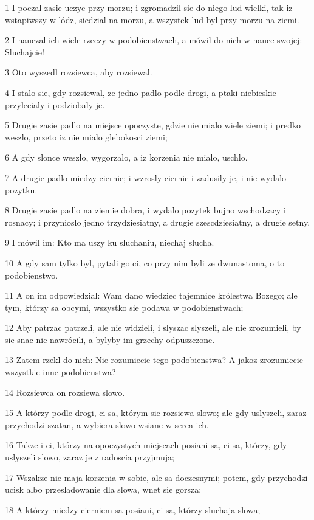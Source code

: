 \par 1 I poczal zasie uczyc przy morzu; i zgromadzil sie do niego lud wielki, tak iz wstapiwszy w lódz, siedzial na morzu, a wszystek lud byl przy morzu na ziemi.
\par 2 I nauczal ich wiele rzeczy w podobienstwach, a mówil do nich w nauce swojej: Sluchajcie!
\par 3 Oto wyszedl rozsiewca, aby rozsiewal.
\par 4 I stalo sie, gdy rozsiewal, ze jedno padlo podle drogi, a ptaki niebieskie przylecialy i podziobaly je.
\par 5 Drugie zasie padlo na miejsce opoczyste, gdzie nie mialo wiele ziemi; i predko weszlo, przeto iz nie mialo glebokosci ziemi;
\par 6 A gdy slonce weszlo, wygorzalo, a iz korzenia nie mialo, uschlo.
\par 7 A drugie padlo miedzy ciernie; i wzrosly ciernie i zadusily je, i nie wydalo pozytku.
\par 8 Drugie zasie padlo na ziemie dobra, i wydalo pozytek bujno wschodzacy i rosnacy; i przynioslo jedno trzydziesiatny, a drugie szescdziesiatny, a drugie setny.
\par 9 I mówil im: Kto ma uszy ku sluchaniu, niechaj slucha.
\par 10 A gdy sam tylko byl, pytali go ci, co przy nim byli ze dwunastoma, o to podobienstwo.
\par 11 A on im odpowiedzial: Wam dano wiedziec tajemnice królestwa Bozego; ale tym, którzy sa obcymi, wszystko sie podawa w podobienstwach;
\par 12 Aby patrzac patrzeli, ale nie widzieli, i slyszac slyszeli, ale nie zrozumieli, by sie snac nie nawrócili, a bylyby im grzechy odpuszczone.
\par 13 Zatem rzekl do nich: Nie rozumiecie tego podobienstwa? A jakoz zrozumiecie wszystkie inne podobienstwa?
\par 14 Rozsiewca on rozsiewa slowo.
\par 15 A którzy podle drogi, ci sa, którym sie rozsiewa slowo; ale gdy uslyszeli, zaraz przychodzi szatan, a wybiera slowo wsiane w serca ich.
\par 16 Takze i ci, którzy na opoczystych miejscach posiani sa, ci sa, którzy, gdy uslyszeli slowo, zaraz je z radoscia przyjmuja;
\par 17 Wszakze nie maja korzenia w sobie, ale sa doczesnymi; potem, gdy przychodzi ucisk albo przesladowanie dla slowa, wnet sie gorsza;
\par 18 A którzy miedzy cierniem sa posiani, ci sa, którzy sluchaja slowa;
